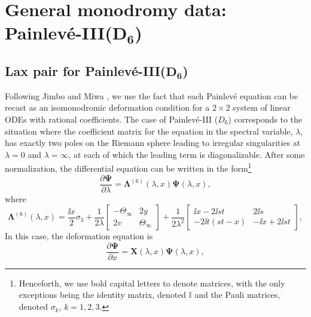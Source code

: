 \section[General monodromy data: Painleve-III(D\_6)]{General monodromy data: Painlev\'e-III($\boldsymbol{D_6}$)}
\label{sec:monodromy-rep-$D_6$}

\subsection[Lax pair for Painleve-III(D\_6)]{Lax pair for Painlev\'e-III($\boldsymbol{D_6}$)}
\label{sec:lax-pair-$D_6$}

Following Jimbo and Miwa \cite{MR625446}, we use the fact that each Painlev\'e equation can be recast as an isomonodromic deformation condition for a $2\times 2$ system of linear ODEs with rational coefficients. The case of Painlev\'e-III ($D_6$) corresponds to the situation where the coefficient matrix for the equation in the spectral variable, $\lambda$, has exactly two poles on the Riemann sphere leading to irregular singularities at $\lambda = 0$ and $\lambda = \infty$, at each of which the leading term is diagonalizable. After some normalization, the differential equation can be written in the form\footnote{Henceforth, we use bold capital letters to denote matrices, with the only exceptions being the identity matrix, denoted $\mathbb{I}$ and the Pauli matrices, denoted $\sigma_k$, $k = 1, 2, 3$.}
\begin{equation}
\label{eq:generic-system}
\frac{\partial\mathbf{\Psi}}{\partial\lambda} = \mathbf{\Lambda}^{(6)}(\lambda, x) \mathbf{\Psi}(\lambda, x),
\end{equation}
where
\begin{equation}
\label{eq:lambda-coefficient-D6}
\mathbf{\Lambda}^{(6)}(\lambda, x) = \frac{\ii x}{2}\sigma_3 + \dfrac{1}{2\lambda} \begin{bmatrix} -\Theta_\infty & 2y \\ 2v & \Theta_\infty \end{bmatrix} + \dfrac{1}{2\lambda^2} \begin{bmatrix} \ii x - 2\ii st & 2\ii s \\ -2\ii t(st - x) & -\ii x + 2\ii st\end{bmatrix},
\end{equation}
In this case, the deformation equation is
\begin{equation}
 \frac{\partial\mathbf{\Psi}}{\partial x} = \mathbf{X}(\lambda, x) \mathbf{\Psi}(\lambda, x),
 \label{eq:generic-deformation}
\end{equation}
